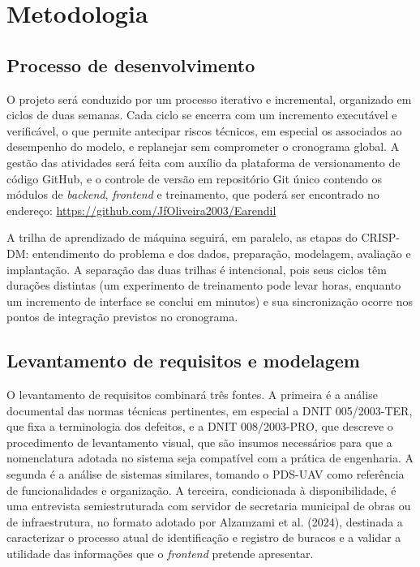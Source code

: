 \documentclass[12pt]{article}
\begin{document}
\section{Metodologia}
\label{sec:metodologia}

\subsection{Processo de desenvolvimento}
\label{sec:processo}

O projeto será conduzido por um processo iterativo e incremental,
organizado em ciclos de duas semanas. Cada ciclo se encerra com um
incremento executável e verificável, o que permite antecipar riscos
técnicos, em especial os associados ao desempenho do modelo, e replanejar
sem comprometer o cronograma global. A gestão das atividades será feita
com auxílio da plataforma de versionamento de código GitHub, e o controle
de versão em repositório Git único contendo os módulos de \emph{backend},
\emph{frontend} e treinamento, que poderá ser encontrado no endereço:
\url{https://github.com/JfOliveira2003/Earendil}

A trilha de aprendizado de máquina seguirá, em paralelo, as etapas do
CRISP-DM: entendimento do problema e dos dados, preparação, modelagem,
avaliação e implantação. A separação das duas trilhas é intencional, pois
seus ciclos têm durações distintas (um experimento de treinamento pode
levar horas, enquanto um incremento de interface se conclui em minutos) e
sua sincronização ocorre nos pontos de integração previstos no
cronograma.

\subsection{Levantamento de requisitos e modelagem}
\label{sec:requisitos}

O levantamento de requisitos combinará três fontes. A primeira é a
análise documental das normas técnicas pertinentes, em especial a DNIT
005/2003-TER, que fixa a terminologia dos defeitos, e a DNIT
008/2003-PRO, que descreve o procedimento de levantamento visual, que são
insumos necessários para que a nomenclatura adotada no sistema seja
compatível com a prática de engenharia. A segunda é a análise de sistemas
similares, tomando o PDS-UAV como referência de funcionalidades e
organização. A terceira, condicionada à disponibilidade, é uma entrevista
semiestruturada com servidor de secretaria municipal de obras ou de
infraestrutura, no formato adotado por Alzamzami et al. (2024), destinada
a caracterizar o processo atual de identificação e registro de buracos e
a validar a utilidade das informações que o \emph{frontend} pretende
apresentar.
\end{document}
